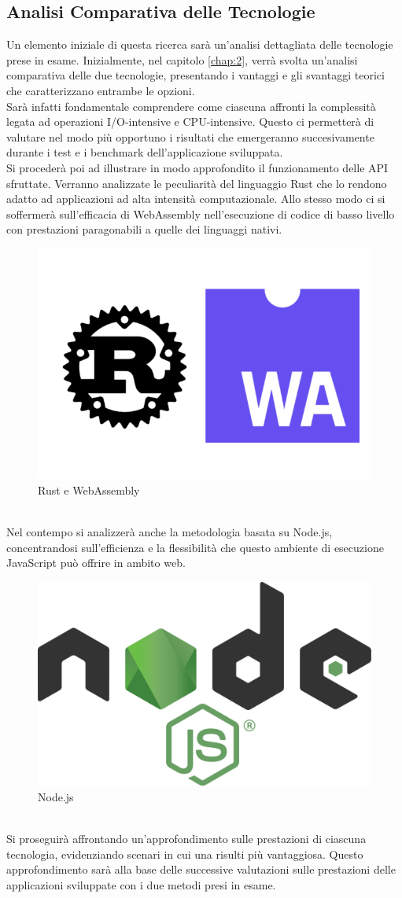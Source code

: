\subsection{Analisi Comparativa delle Tecnologie}
Un elemento iniziale di questa ricerca sarà un'analisi dettagliata delle tecnologie prese in esame. 
Inizialmente, nel capitolo \ref{chap:2}, verrà svolta un'analisi comparativa delle due tecnologie, presentando i vantaggi e gli svantaggi teorici che caratterizzano entrambe le opzioni.
\\Sarà infatti fondamentale comprendere come ciascuna affronti la complessità legata ad operazioni I/O-intensive e CPU-intensive. Questo ci permetterà di valutare nel modo più opportuno i risultati che emergeranno succesivamente durante i test e i benchmark dell'applicazione sviluppata.
\\Si procederà poi ad illustrare in modo approfondito il funzionamento delle API sfruttate. Verranno analizzate le peculiarità del linguaggio Rust che lo rendono adatto ad applicazioni ad alta intensità computazionale. Allo stesso modo ci si soffermerà sull'efficacia di WebAssembly nell'esecuzione di codice di basso livello con prestazioni paragonabili a quelle dei linguaggi nativi.
\begin{figure}
        \begin{center}
                \includegraphics[width=0.3\columnwidth]{images/rustwasm.jpg}
        \end{center}
        \caption{Rust e WebAssembly}
        \label{fig:rustwasm}
\end{figure} 
\\Nel contempo si analizzerà anche la metodologia basata su Node.js, concentrandosi sull'efficienza e la flessibilità che questo ambiente di esecuzione JavaScript può offrire in ambito web.
\begin{figure}
        \begin{center}
                \includegraphics[width=0.3\columnwidth]{images/node.png}
        \end{center}
        \caption{Node.js}
        \label{fig:rustwasm}
\end{figure} 
\\Si proseguirà affrontando un'approfondimento sulle prestazioni di ciascuna tecnologia, evidenziando scenari in cui una risulti più vantaggiosa. Questo approfondimento sarà alla base delle successive valutazioni sulle prestazioni delle applicazioni sviluppate con i due metodi presi in esame.

